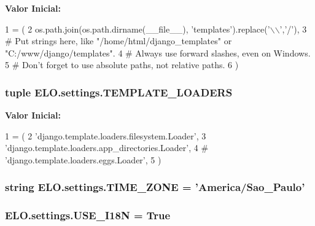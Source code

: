 {\bfseries Valor Inicial\-:}
\begin{DoxyCode}
1 = (
2     os.path.join(os.path.dirname(\_\_file\_\_), \textcolor{stringliteral}{'templates'}).replace(\textcolor{stringliteral}{'\(\backslash\)\(\backslash\)'},\textcolor{stringliteral}{'/'}),
3     \textcolor{comment}{# Put strings here, like "/home/html/django\_templates" or "C:/www/django/templates".}
4     \textcolor{comment}{# Always use forward slashes, even on Windows.}
5     \textcolor{comment}{# Don't forget to use absolute paths, not relative paths.}
6 )
\end{DoxyCode}
\hypertarget{namespaceELO_1_1settings_a9c876284f3865d5a15a73bedccfe3bb7}{
\subsubsection[{T\-E\-M\-P\-L\-A\-T\-E\-\_\-\-L\-O\-A\-D\-E\-R\-S}]{\setlength{\rightskip}{0pt plus 5cm}tuple E\-L\-O.\-settings.\-T\-E\-M\-P\-L\-A\-T\-E\-\_\-\-L\-O\-A\-D\-E\-R\-S}}\label{df/d5b/namespaceELO_1_1settings_a9c876284f3865d5a15a73bedccfe3bb7}
{\bfseries Valor Inicial\-:}
\begin{DoxyCode}
1 = (
2     \textcolor{stringliteral}{'django.template.loaders.filesystem.Loader'},
3     \textcolor{stringliteral}{'django.template.loaders.app\_directories.Loader'},
4 \textcolor{comment}{#     'django.template.loaders.eggs.Loader',}
5 )
\end{DoxyCode}
\hypertarget{namespaceELO_1_1settings_aafd318ffa70db1890eaf1f8621e19d53}{
\subsubsection[{T\-I\-M\-E\-\_\-\-Z\-O\-N\-E}]{\setlength{\rightskip}{0pt plus 5cm}string E\-L\-O.\-settings.\-T\-I\-M\-E\-\_\-\-Z\-O\-N\-E = 'America/Sao\-\_\-\-Paulo'}}\label{df/d5b/namespaceELO_1_1settings_aafd318ffa70db1890eaf1f8621e19d53}
\hypertarget{namespaceELO_1_1settings_a2d03ced1be44b9d7937bdbc870474ffe}{
\subsubsection[{U\-S\-E\-\_\-\-I18\-N}]{\setlength{\rightskip}{0pt plus 5cm}E\-L\-O.\-settings.\-U\-S\-E\-\_\-\-I18\-N = True}}\label{df/d5b/namespaceELO_1_1settings_a2d03ced1be44b9d7937bdbc870474ffe}
